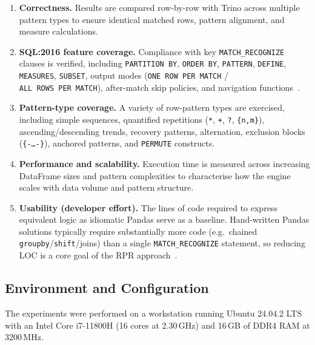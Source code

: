 \begin{enumerate}
  \item \textbf{Correctness.}
    Results are compared row-by-row with Trino across multiple
    pattern types to ensure identical matched rows, pattern
    alignment, and measure calculations.

  \item \textbf{SQL:2016 feature coverage.}
    Compliance with key \texttt{MATCH\_RECOGNIZE} clauses is
    verified, including \texttt{PARTITION~BY}, \texttt{ORDER~BY},
    \texttt{PATTERN}, \texttt{DEFINE}, \texttt{MEASURES},
    \texttt{SUBSET}, output modes (\texttt{ONE~ROW~PER~MATCH} /
    \texttt{ALL~ROWS~PER~MATCH}), after-match skip policies, and
    navigation
    functions~\cite{iso2016,ISO2021,monierashraf2025rowmatch}.

  \item \textbf{Pattern-type coverage.}
    A variety of row-pattern types are exercised, including simple
    sequences, quantified repetitions
    (\texttt{*}, \texttt{+}, \texttt{?}, \texttt{\{n,m\}}),
    ascending/descending trends, recovery patterns, alternation,
    exclusion blocks (\texttt{\{-\ldots-\}}), anchored patterns,
    and \texttt{PERMUTE} constructs.

  \item \textbf{Performance and scalability.}
    Execution time is measured across increasing DataFrame sizes
    and pattern complexities to characterise how the engine scales
    with data volume and pattern structure.

  \item \textbf{Usability (developer effort).}
    The lines of code required to express equivalent logic as
    idiomatic Pandas serve as a baseline.  Hand-written Pandas
    solutions typically require substantially more code
    (e.g.\ chained \texttt{groupby}/\texttt{shift}/joins) than a
    single \texttt{MATCH\_RECOGNIZE} statement, so reducing LOC
    is a core goal of the RPR
    approach~\cite{iso2016,ISO2021,melton2017sqlrpr,Python_UDF}.
\end{enumerate}

\subsection{Environment and Configuration}
\label{subsec:eval-environment}

The experiments were performed on a workstation running Ubuntu
24.04.2 LTS with an Intel Core i7-11800H (16 cores at 2.30\,GHz)
and 16\,GB of DDR4 RAM at 3200\,MHz.


